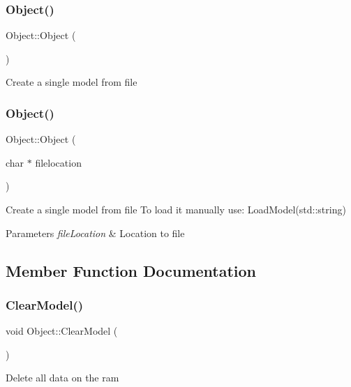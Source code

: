 \subsubsection{\texorpdfstring{Object()}{Object()}\hspace{0.1cm}{\footnotesize\ttfamily [1/2]}}
{\footnotesize\ttfamily Object\+::\+Object (\begin{DoxyParamCaption}{ }\end{DoxyParamCaption})}

Create a single model from file \mbox{\label{class_object_ab2f2852d5c4d9bf362e8bc41971a0f89}} 
\subsubsection{\texorpdfstring{Object()}{Object()}\hspace{0.1cm}{\footnotesize\ttfamily [2/2]}}
{\footnotesize\ttfamily Object\+::\+Object (\begin{DoxyParamCaption}\item[{char $\ast$}]{filelocation }\end{DoxyParamCaption})}

Create a single model from file To load it manually use\+: Load\+Model(std\+::string) 
\begin{DoxyParams}{Parameters}
{\em file\+Location} & Location to file \\
\hline
\end{DoxyParams}


\subsection{Member Function Documentation}
\mbox{\label{class_object_aa7b0a877f291651c2a03fc62e4271653}} 
\subsubsection{\texorpdfstring{ClearModel()}{ClearModel()}}
{\footnotesize\ttfamily void Object\+::\+Clear\+Model (\begin{DoxyParamCaption}{ }\end{DoxyParamCaption})}

Delete all data on the ram \mbox{\label{class_object_a598fffc7b3d107fb5566a31ecb7d48f2}} 
